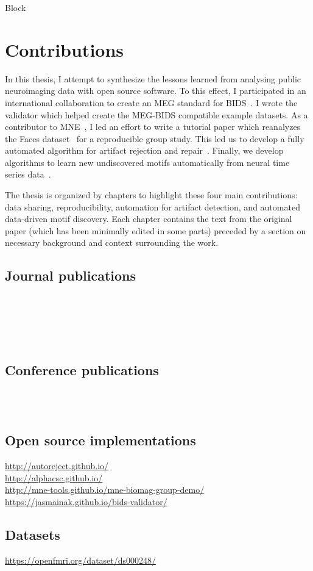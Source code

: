 Block


\clearpage
\section{Contributions}
In this thesis, I attempt to synthesize the lessons learned from analysing public neuroimaging data with open source software. To this effect, I participated in an international collaboration to create an \ac{MEG} standard for  \ac{BIDS}~\citep{galan2017meg}. I wrote the validator which helped create the MEG-BIDS compatible example datasets. As a contributor to MNE~\citep{gramfort2013meg}, I led an effort to write a tutorial paper which reanalyzes the Faces dataset~\citep{wakeman2015multi} for a reproducible group study. This led us to develop a fully automated algorithm for artifact rejection and repair~\citep{jas2016automated, jas2017autoreject}. Finally, we develop algorithms to learn new undiscovered motifs automatically from neural time series data~\citep{jas2017learning}. 

The thesis is organized by chapters to highlight these four main  contributions: data sharing, reproducibility, automation for artifact detection, and automated data-driven motif discovery. Each chapter contains the text from the original paper (which has been minimally edited in some parts) preceded by a section on necessary background and context surrounding the work.

\subsection*{Journal publications}
\ \\ \\
\ \\ \\

\subsection*{Conference publications}
\ \\ \\

\subsection*{Open source implementations}

\url{http://autoreject.github.io/} \\
\url{http://alphacsc.github.io/} \\
\url{http://mne-tools.github.io/mne-biomag-group-demo/} \\
\url{https://jasmainak.github.io/bids-validator/}

\subsection*{Datasets}

\url{https://openfmri.org/dataset/ds000248/}